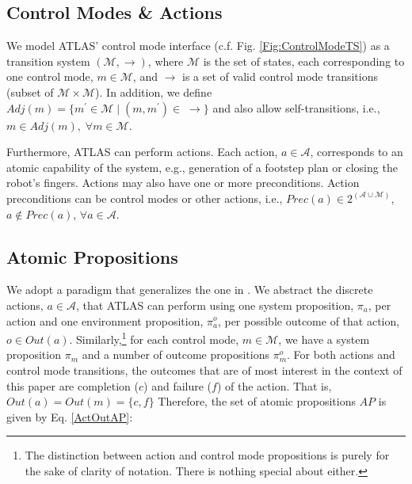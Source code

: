 
\subsection{Control Modes \& Actions}

We model ATLAS' control mode interface (c.f. Fig. \ref{Fig:ControlModeTS}) as a transition system $(\mathcal{M}, \boldsymbol\rightarrow)$, where $\mathcal{M}$ is the set of states, each corresponding to one control mode, $m \in \mathcal{M}$, and $\boldsymbol\rightarrow$ is a set of valid control mode transitions (subset of $\mathcal{M} \times \mathcal{M}$).
In addition, we define $Adj(m) = \{ m^\prime \in \mathcal{M} \; | \; (m, m^\prime) \in \; \boldsymbol\rightarrow \}$ and also allow self-transitions, i.e., $m \in Adj(m), \; \forall m \in \mathcal{M}$.

Furthermore, ATLAS can perform actions. Each action, $a \in \mathcal{A}$, corresponds to an atomic capability of the system, e.g., generation of a footstep plan or closing the robot's fingers.
Actions may also have one or more preconditions.
Action preconditions can be control modes or other actions, i.e., $Prec(a) \in 2^{(\mathcal{A} \cup \mathcal{M})}$, $a \not \in Prec(a)$, $\forall a \in \mathcal{A}$.

\subsection{Atomic Propositions}


We adopt a paradigm that generalizes the one in \cite{Vasu2013ICRA}.
We abstract the discrete actions, $a \in \mathcal{A}$, that ATLAS can perform using one system proposition, $\pi_a$, per action and one environment proposition, $\pi_a^o$, per possible outcome of that action, $o \in Out(a)$.
Similarly,\footnote{The distinction between action and control mode propositions is purely for the sake of clarity of notation. There is nothing special about either.}
for each control mode, $m \in \mathcal{M}$, we have a system proposition $\pi_m$ and a number of outcome propositions $\pi_m^o$.
For both actions and control mode transitions, the outcomes that are of most interest in the context of this paper are completion ($c$) and failure ($f$) of the action. That is, $Out(a) = Out(m) = \{ c, f \}$
Therefore, the set of atomic propositions $AP$ is given by Eq. \eqref{ActOutAP}:

